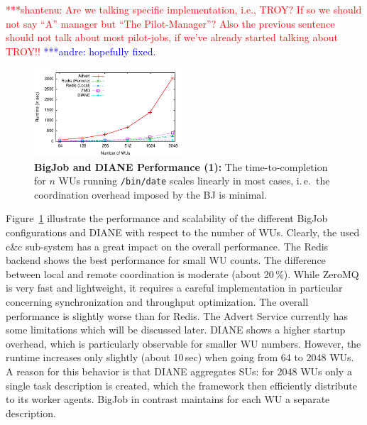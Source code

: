 \documentclass[conference,final]{IEEEtran}
\makeatletter
\def\reduwave{\bgroup \markoverwith{\lower3.5\p@\hbox{\sixly \textcolor{red}{\char58}}}\ULon}
\newcommand{\jwave}[1]{ {\reduwave{#1}}}
\newcommand{\jhanote}[1]{ {\textcolor{red} { ***shantenu: #1 }}}
\newcommand{\alnote}[1]{ {\textcolor{blue} { ***andre: #1 }}}
\newcommand{\jwave}[1]{#1}
\newcommand{\alnote}[1]{}
\newcommand{\jhanote}[1]{}
\makeatother
\begin{document}

\jhanote{Are we talking specific implementation, i.e., TROY? If so we
  should not say ``A'' manager but ``The Pilot-Manager''? Also the previous
sentence should not talk about most pilot-jobs, if we've already started
talking about TROY!!} \alnote{hopefully fixed.} 



\begin{figure}[htbp] \centering
\includegraphics[width=0.49\textwidth]{perf/bigjob-varying-wus-alamo.pdf}
\caption{\textbf{BigJob and DIANE Performance (1):} The 
time-to-completion for $n$ WUs running \texttt{/bin/date} scales linearly
in most cases, i.\,e.\ the coordination overhead imposed by the BJ is 
minimal. }
\label{fig:perf_bigjob-varying-wus} \end{figure}

Figure~\ref{fig:perf_bigjob-varying-wus} illustrate the performance and
scalability of the different BigJob configurations and DIANE with respect to the
number of WUs. Clearly, the used c\&c sub-system has a great impact on the
overall performance. The Redis backend shows the best performance for small WU
counts. The difference between local and remote coordination is moderate (about
20\,\%). While ZeroMQ is very fast and lightweight, it requires a careful
implementation in particular concerning synchronization and throughput
optimization. The overall performance is slightly worse than for Redis. The
Advert Service currently has some limitations which will be discussed later.
DIANE shows a higher startup overhead, which is particularly observable for
smaller WU numbers. However, the runtime increases only slightly (about 10\,sec)
when going from 64 to 2048 WUs. A reason for this behavior is that DIANE
aggregates SUs: for 2048 WUs only a single task description is created, which
the framework then efficiently distribute to its worker agents. BigJob in
contrast maintains for each WU a separate description. 
\end{document}
